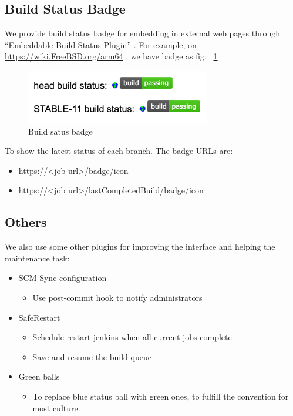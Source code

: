 \documentclass[a4paper,twocolumn,10pt]{article}
\begin{document}
\subsection{Build Status Badge}

We provide build status badge for embedding in external web pages through
``Embeddable Build Status Plugin''
\cite{jenkins-embeddable-build-status-plugin}. For example, on
\url{https://wiki.FreeBSD.org/arm64} , we have badge as fig.
~\ref{build-status-badge}

\begin{figure}
\includegraphics{build-status-badge.png}
\caption{Build satus badge}
\label{build-status-badge}
\end{figure}

To show the latest status of each branch. The badge URLs are:
\begin{itemize}
\item \url{https://<job-url>/badge/icon}
\item \url{https://<job url>/lastCompletedBuild/badge/icon}
\end{itemize}

\subsection{Others}

We also use some other plugins for improving the interface and helping the
maintenance task:

\begin{itemize}
\item SCM Sync configuration \cite{jenkins-scm-sync-configuration-plugin}
  \begin{itemize}
  \item Use post-commit hook to notify administrators
  \end{itemize}
\item SafeRestart \cite{jenkins-saferestart-plugin}
  \begin{itemize}
  \item Schedule restart jenkins when all current jobs complete
  \item Save and resume the build queue
  \end{itemize}
\item Green balls \cite{jenkins-green-balls-plugin}
  \begin{itemize}
  \item To replace blue status ball with green ones, to fulfill the convention
        for most culture.
  \end{itemize}
\end{itemize}
\end{document}
